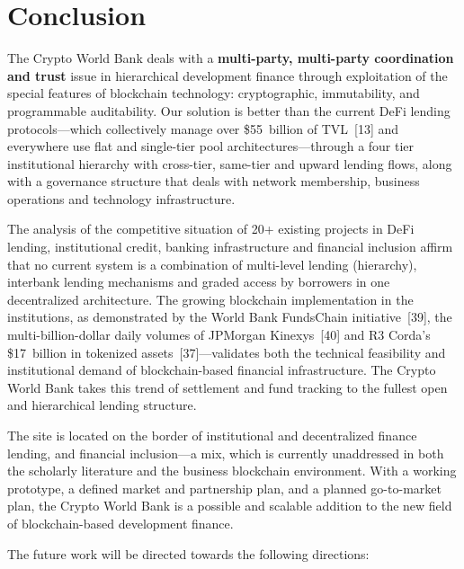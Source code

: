 \documentclass[12pt,a4paper]{report}
\begin{document}
\chapter{Conclusion}

The Crypto World Bank deals with a \textbf{multi-party, multi-party coordination and trust} issue in hierarchical development finance through exploitation of the special features of blockchain technology: cryptographic, immutability, and programmable auditability. Our solution is better than the current DeFi lending protocols---which collectively manage over \$55~billion of TVL~[13] and everywhere use flat and single-tier pool architectures---through a four tier institutional hierarchy with cross-tier, same-tier and upward lending flows, along with a governance structure that deals with network membership, business operations and technology infrastructure.

The analysis of the competitive situation of 20+ existing projects in DeFi lending, institutional credit, banking infrastructure and financial inclusion affirm that no current system is a combination of multi-level lending (hierarchy), interbank lending mechanisms and graded access by borrowers in one decentralized architecture. The growing blockchain implementation in the institutions, as demonstrated by the World Bank FundsChain initiative~[39], the multi-billion-dollar daily volumes of JPMorgan Kinexys~[40] and R3 Corda's \$17~billion in tokenized assets~[37]---validates both the technical feasibility and institutional demand of blockchain-based financial infrastructure. The Crypto World Bank takes this trend of settlement and fund tracking to the fullest open and hierarchical lending structure.

The site is located on the border of institutional and decentralized finance lending, and financial inclusion---a mix, which is currently unaddressed in both the scholarly literature and the business blockchain environment. With a working prototype, a defined market and partnership plan, and a planned go-to-market plan, the Crypto World Bank is a possible and scalable addition to the new field of blockchain-based development finance.

The future work will be directed towards the following directions:
\end{document}
